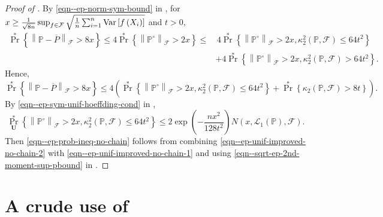 \begin{proof}[Proof of ]
By \eqref{eqn--ep-norm-sym-bound} in , for \(x \geq
\frac{1}{\sqrt{8 n}} \sup_{f \in \mathcal{F}} \sqrt{\frac{1}{n}
\sum_{i = 1}^{n} \mathrm{Var} \left[ f \left( X_{i} \right) \right]}\) and \(t > 0\),
\begin{align*}
  \Pr^{\ast} \left\{ \left\| \mathbb{P} - \overline{P} \right\|_{\mathcal{F}} >
  8 x \right\} \leq 4 \Pr^{\ast} \left\{ \left\| \mathbb{P}^{\circ}
  \right\|_{\mathcal{F}} > 2 x \right\} \leq
  & \, 4 \Pr^{\ast} \left\{ \left\| \mathbb{P}^{\circ} \right\|_{\mathcal{F}} >
  2 x, \kappa_{2}^{2} (\mathbb{P}, \mathcal{F}) \leq 64 t^{2} \right\} \\
  & + 4 \Pr^{\ast} \left\{ \left\| \mathbb{P}^{\circ} \right\|_{\mathcal{F}} > 2
  x, \kappa_{2}^{2} (\mathbb{P}, \mathcal{F}) > 64 t^{2} \right\}.
\end{align*}
Hence,
\begin{equation}
  \Pr^{\ast} \left\{ \left\| \mathbb{P} - \overline{P} \right\|_{\mathcal{F}} >
  8 x \right\} \leq 4 \left( \Pr^{\ast} \left\{ \left\| \mathbb{P}^{\circ}
  \right\|_{\mathcal{F}} > 2 x, \kappa_{2}^{2} (\mathbb{P}, \mathcal{F}) \leq 64
  t^{2} \right\} + \Pr^{\ast} \left\{ \kappa_{2} (\mathbb{P}, \mathcal{F}) >
  8 t \right\} \right).
  \label{eqn--ep-unif-improved-no-chain-1}
\end{equation}
By \eqref{eqn--ep-sym-unif-hoeffding-cond} in
,
\begin{equation}
  \Pr_{\mathbf{U}}^{\ast} \left\{ \left\| \mathbb{P}^{\circ}
  \right\|_{\mathcal{F}} > 2 x, \kappa_{2}^{2} (\mathbb{P}, \mathcal{F}) \leq 64
  t^{2} \right\} \leq 2 \exp \left( - \frac{n x^{2}}{128 t^{2}} \right) N \left(
  x, \mathscr{L}_{1} (\mathbb{P}), \mathcal{F} \right).
  \label{eqn--ep-unif-improved-no-chain-2}
\end{equation}
Then \eqref{eqn--ep-prob-ineq-no-chain} follows from combining
\eqref{eqn--ep-unif-improved-no-chain-2} with
\eqref{eqn--ep-unif-improved-no-chain-1} and using
\eqref{eqn--sqrt-ep-2nd-moment-sup-pbound} in
.
\end{proof}

\section{A crude use of \texorpdfstring{%
}{Lemma
\ref{lem--ep-sym-unif-hoeffding-cond}}}

